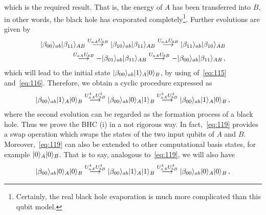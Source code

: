 \documentclass[12pt,a4paper]{article}
\begin{document}
which is the required result. That is, the energy of $A$ has been
transferred into $B$, in other words, the black hole has evaporated completely\footnote{Certainly, the real black hole evaporation is much more complicated than this qubit model.}. Further evolutions are given by
\begin{equation}
\label{eq:118}
\begin{split}
\arrowvert \beta_{00}\rangle_{ab}\arrowvert \beta_{11}\rangle_{AB}
\stackrel{U_{aA}U_{bB}}{\longrightarrow}\arrowvert
\beta_{10}\rangle_{ab}\arrowvert
\beta_{11}\rangle_{AB}\stackrel{U_{aA}U_{bB}}{\longrightarrow}\arrowvert
\beta_{11}\rangle_{ab}\arrowvert \beta_{10}\rangle_{AB} \\
\stackrel{U_{aA}U_{bB}}{\longrightarrow}-\arrowvert
\beta_{01}\rangle_{ab}\arrowvert
\beta_{11}\rangle_{AB}\stackrel{U_{aA}U_{bB}}{\longrightarrow}-\arrowvert
\beta_{00}\rangle_{ab}\arrowvert \beta_{11}\rangle_{AB} \,,
\end{split}
\end{equation}
which will lead to the initial state
$\arrowvert\beta_{00}\rangle_{ab}\arrowvert 1\rangle_A\arrowvert
0\rangle_B$, by using of~\eqref{eq:115} and~\eqref{eq:116}.
Therefore, we obtain a cyclic procedure expressed as
\begin{equation}
\label{eq:119}
\begin{split}
\arrowvert\beta_{00}\rangle_{ab}\arrowvert 1\rangle_A\arrowvert
0\rangle_B
\stackrel{U_{aA}^4U_{bB}^4}{\longrightarrow}\arrowvert\beta_{00}\rangle_{ab}\arrowvert
0\rangle_A\arrowvert
1\rangle_B\stackrel{U_{aA}^4U_{bB}^4}{\longrightarrow}\arrowvert\beta_{00}\rangle_{ab}\arrowvert
1\rangle_A\arrowvert 0\rangle_B \,,
\end{split}
\end{equation}
where the second evolution can be regarded as the formation
process of a black hole. Thus we prove the BHC (i) in a not
rigorous way. In fact,~\eqref{eq:119} provides a swap operation which swaps the states
of the two input qubits of $A$ and $B$.  Moreover,~\eqref{eq:119} can also be extended to
other computational basis states, for example $\arrowvert
0\rangle_A\arrowvert 0\rangle_B$. That is to
say, analogous to~\eqref{eq:119}, we will also have
\begin{equation}
\label{eq:120}
\begin{split}
\arrowvert\beta_{00}\rangle_{ab}\arrowvert 0\rangle_A\arrowvert
0\rangle_B
\stackrel{U_{aA}^4U_{bB}^4}{\longrightarrow}\arrowvert\beta_{00}\rangle_{ab}\arrowvert
1\rangle_A\arrowvert
1\rangle_B\stackrel{U_{aA}^4U_{bB}^4}{\longrightarrow}\arrowvert\beta_{00}\rangle_{ab}\arrowvert
0\rangle_A\arrowvert 0\rangle_B \,,
\end{split}
\end{equation}
\end{document}
